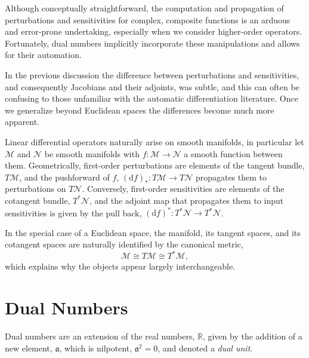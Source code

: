 Although conceptually straightforward, the computation and propagation of perturbations and 
sensitivities for complex, composite functions is an arduous and error-prone undertaking, especially
when we consider higher-order operators.  Fortunately, dual numbers implicitly incorporate these 
manipulations and allows for their automation.

\begin{tcolorbox}[colback=gray90,colframe=gray90, coltitle=black,
title=\textbf{Geometric Interpretation of Linear Differential Operators}]

In the previous discussion the difference between perturbations and sensitivities, and 
consequently Jacobians and their adjoints, was subtle, and this can often be
confusing to those unfamiliar with the automatic differentiation literature.  Once we
generalize beyond Euclidean spaces the differences become much more apparent.

\parindent=15pt

Linear differential operators naturally arise on smooth manifolds,
in particular let $\mathcal{M}$ and $\mathcal{N}$ be smooth manifolds with 
$f : \mathcal{M} \rightarrow \mathcal{N}$ a smooth function between them.  Geometrically,
first-order perturbations are elements of the tangent bundle, $T \mathcal{M}$, and the 
pushforward of $f$, $ \left( \mathrm{d} f \right)_{*} : T\mathcal{M} \rightarrow T \mathcal{N}$ 
propagates them to perturbations on $T \mathcal{N}$.  Conversely, first-order sensitivities are
elements of the cotangent bundle, $T^{*} \mathcal{N}$, and the adjoint map that propagates
them to input sensitivities is given by the pull back,
$ \left( \mathrm{d} f \right)^{*} : T^{*} \mathcal{N} \rightarrow T^{*} \mathcal{N}$.

In the special case of a Euclidean space, the manifold, its tangent spaces, and its cotangent
spaces are naturally identified by the canonical metric,
%
\begin{equation*}
\mathcal{M} \cong T \mathcal{M} \cong T^{*} \mathcal{M},
\end{equation*}
%
which explains why the objects appear largely interchangeable.

\end{tcolorbox}

\section{Dual Numbers}

Dual numbers are an extension of the real numbers, $\mathbb{R}$, given by the
addition of a new element, $\mathfrak{a}$, which is nilpotent, $\mathfrak{a}^{2} = 0$,
and denoted a \textit{dual unit}.

